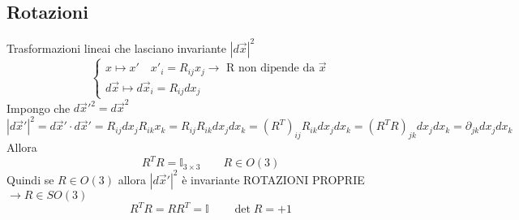 \subsection*{Rotazioni}
Trasformazioni lineai che lasciano invariante ${|d\vec{x}|}^2$
\begin{equation*}
    \begin{cases}
        x \mapsto x' \quad x'_i = R_{ij} x_j \rightarrow \text{ R non dipende da $\vec{x}$} \\
        d\vec{x} \mapsto d\vec{x}_i = R_{ij}dx_j
    \end{cases}
\end{equation*}
Impongo che $d\vec{x}'^2 = d\vec{x}^2$
\begin{equation*}
    {|d\vec{x}'|}^2 = d\vec{x}' \cdot d\vec{x}' = R_{ij} dx_j R_{ik} x_k = R_{ij}R_{ik}dx_jdx_k = {(R^T)}_{ij}R_{ik}dx_jdx_k = {(R^TR)}_{jk}dx_jdx_k = \partial_{jk}dx_jdx_k
\end{equation*}
Allora 
\begin{equation*}
    R^TR = \mathbb{I}_{3\times3} \qquad R \in O(3)
\end{equation*}
Quindi se $R\in O(3)$ allora ${|d\vec{x}'|}^2$ è invariante \newline
ROTAZIONI PROPRIE $\rightarrow R \in SO(3)$
\begin{equation*}
    R^TR = RR^T = \mathbb{I} \qquad \det{R} = +1
\end{equation*}
